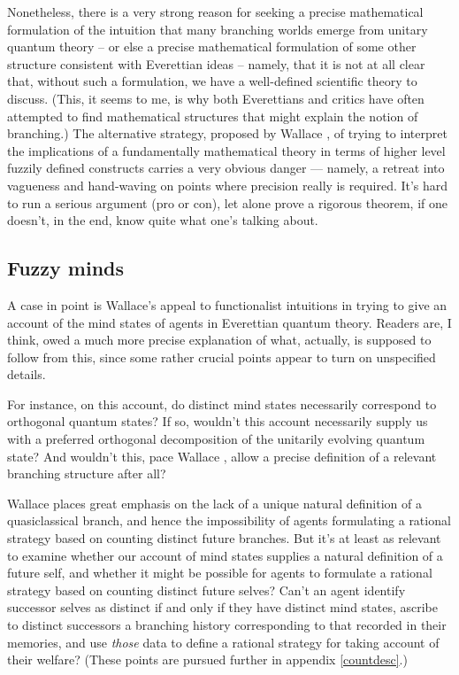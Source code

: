 \documentclass[aps,
pra,epsfig,12pt,nofootinbib]{revtex4}
\begin{document}
Nonetheless, there is a very strong reason
for seeking \cite{akcritique} a precise mathematical
formulation of the intuition that many branching worlds emerge from 
unitary quantum theory -- or else a precise mathematical formulation
of some other structure consistent with Everettian ideas -- 
namely, that it is not at all clear that,
without such a formulation, we have a well-defined scientific theory
to discuss.   (This, it seems to me, is why both  
Everettians \cite{graham, deutschone} and
critics \cite{bellmw,almanyminds} have often attempted to find  
mathematical structures that might explain the notion of 
branching.)    The alternative 
strategy, proposed by Wallace \cite{wallacevolone}, of trying 
to interpret the implications of 
a fundamentally mathematical theory in terms of 
higher level fuzzily defined constructs carries a very obvious
danger --- namely, a retreat into vagueness and hand-waving on points where 
precision really is required.  
It's hard to run a serious argument (pro or con), let alone prove a 
rigorous theorem, if one doesn't, in the end, know quite what 
one's talking about.   

\subsection{Fuzzy minds}

A case in point is Wallace's appeal to functionalist intuitions in 
trying to give an account of the 
mind states of agents in Everettian quantum theory.
Readers are, I think, owed a much more precise explanation of what, actually, 
is supposed to follow from this, since
some rather crucial points appear to turn on unspecified details. 

For instance, on this account, do 
distinct mind states necessarily correspond to orthogonal quantum states?
If so, wouldn't this account necessarily supply us with a 
preferred orthogonal decomposition of the unitarily evolving 
quantum state?   And wouldn't this, pace Wallace \cite{wallacevolone}, 
allow a precise definition of a relevant branching structure after all?   

Wallace places great emphasis on the lack of a 
unique natural definition of a quasiclassical branch, and hence
the impossibility of agents formulating a rational strategy based
on counting distinct future branches.    
But it's at least as relevant to examine whether our account 
of mind states supplies a natural definition of a future self, and 
whether it might be possible for agents to formulate a rational 
strategy based on counting distinct future
selves?   Can't an agent identify successor selves as distinct if and 
only if they have distinct mind states, ascribe to distinct successors
a branching history corresponding to that recorded in their memories,
and use {\it those} data to define a rational strategy for taking account
of their welfare? (These points are pursued further in appendix
\ref{countdesc}.)  
\end{document}
